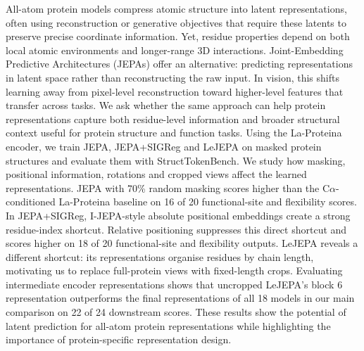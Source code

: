 All-atom protein models compress atomic structure into latent representations, often using reconstruction or generative objectives that require these latents to preserve precise coordinate information. Yet, residue properties depend on both local atomic environments and longer-range 3D interactions. Joint-Embedding Predictive Architectures (JEPAs) offer an alternative: predicting representations in latent space rather than reconstructing the raw input. In vision, this shifts learning away from pixel-level reconstruction toward higher-level features that transfer across tasks. We ask whether the same approach can help protein representations capture both residue-level information and broader structural context useful for protein structure and function tasks. Using the La-Proteina encoder, we train JEPA, JEPA+SIGReg and LeJEPA on masked protein structures and evaluate them with StructTokenBench. We study how masking, positional information, rotations and cropped views affect the learned representations. JEPA with 70\% random masking scores higher than the C$\alpha$-conditioned La-Proteina baseline on 16 of 20 functional-site and flexibility scores. In JEPA+SIGReg, I-JEPA-style absolute positional embeddings create a strong residue-index shortcut. Relative positioning suppresses this direct shortcut and scores higher on 18 of 20 functional-site and flexibility outputs. LeJEPA reveals a different shortcut: its representations organise residues by chain length, motivating us to replace full-protein views with fixed-length crops. Evaluating intermediate encoder representations shows that uncropped LeJEPA's block 6 representation outperforms the final representations of all 18 models in our main comparison on 22 of 24 downstream scores. These results show the potential of latent prediction for all-atom protein representations while highlighting the importance of protein-specific representation design.
